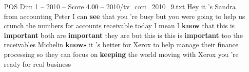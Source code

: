 \begin{textsample}{POS Dim 1 – 2010 – Score 4.00 – 2010/tv\_com\_2010\_9.txt}  \label{ex:f1_pos_070}
Hey it 's Sandra from accounting Peter I can \textbf{see} that you 're busy but you were going to help us crunch the numbers for accounts receivable today I mean I \textbf{know} that this is \textbf{important} both are \textbf{important} they are but this is this is \textbf{important} too the receivables Michelin \textbf{knows} it 's better for Xerox to help manage their finance processing so they can focus on \textbf{keeping} the world moving with Xerox you 're ready for real business

\end{textsample}
